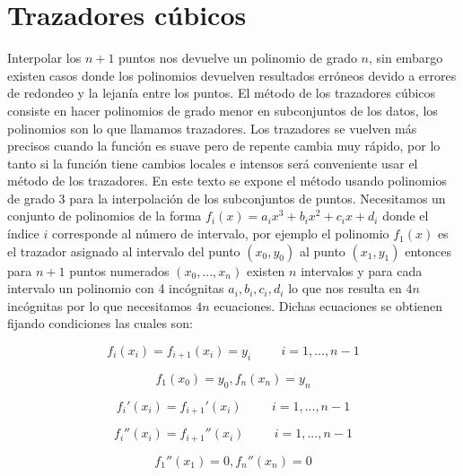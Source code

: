 \documentclass[10pt,twocolumn]{article}
\begin{document}
\section{Trazadores c\'ubicos}
Interpolar los $n+1$ puntos nos devuelve un polinomio de grado $n$, sin embargo existen casos donde los polinomios devuelven resultados err\'oneos 
devido a errores de redondeo y la lejan\'ia entre los puntos. El m\'etodo de los trazadores c\'ubicos consiste en hacer polinomios de grado menor en 
subconjuntos de los datos, los polinomios son lo que llamamos trazadores. Los trazadores se vuelven m\'as precisos cuando la funci\'on es suave pero 
de repente cambia muy r\'apido, por lo tanto si la funci\'on tiene cambios locales e intensos ser\'a conveniente usar el m\'etodo de los trazadores. En 
este texto se expone el m\'etodo usando polinomios de grado 3 para la interpolaci\'on de los subconjuntos de puntos. Necesitamos un conjunto de 
polinomios de la forma $f_i(x)=a_ix^3 + b_ix^2 + c_ix + d_i$ donde el \'indice $i$ corresponde al n\'umero de intervalo, por ejemplo el polinomio 
$f_1(x)$ es el trazador asignado al intervalo del punto $(x_0,y_0)$ al punto $(x_1,y_1)$ entonces para $n+1$ puntos numerados $(x_0,...,x_n)$ existen 
$n$ 
intervalos y 
para 
cada 
intervalo un polinomio con 4 inc\'ognitas $a_i,b_i,c_i,d_i$ lo que nos resulta en $4n$ inc\'ognitas por lo que necesitamos $4n$ ecuaciones. Dichas 
ecuaciones se obtienen fijando condiciones las cuales son:

\begin{equation}
	f_i(x_i)=f_{i+1}(x_i)=y_i \hspace{1cm} i=1,...,n-1
\label{cond1}
\end{equation}

\begin{equation}
	f_1(x_0)=y_0 , f_n(x_n)=y_n
\label{cond2}
\end{equation}

\begin{equation}
	f_i'(x_i)=f_{i+1}'(x_i) \hspace{1cm} i=1,...,n-1
\label{cond3}
\end{equation}

\begin{equation}
	f_i''(x_i)=f_{i+1}''(x_i) \hspace{1cm} i=1,...,n-1
\label{cond4}
\end{equation}

\begin{equation}
	f_1''(x_1)=0 , f_n''(x_n)=0
\label{cond5}
\end{equation}
\end{document}
